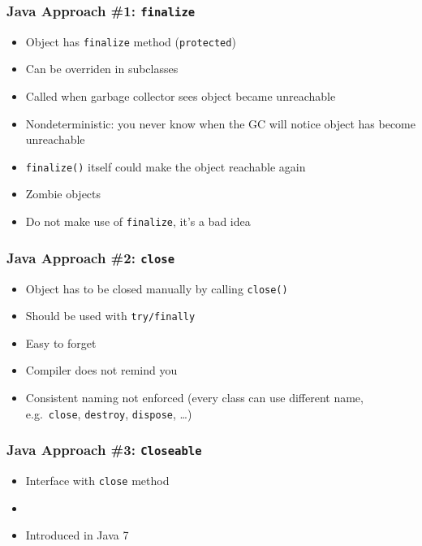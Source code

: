 \begin{frame}
  \frametitle{Java Approach \#1: {\tt finalize}}
  \begin{itemize}
    \item Object has {\tt finalize} method ({\tt protected})
    \item Can be overriden in subclasses
    \item Called when garbage collector sees object became unreachable
  \end{itemize}
  \vskip5mm
  \begin{itemize}
    \item Nondeterministic: you never know when the GC will notice object has become unreachable
    \item {\tt finalize()} itself could make the object reachable again
    \item Zombie objects
    \item Do not make use of {\tt finalize}, it's a bad idea
  \end{itemize}
\end{frame}

\begin{frame}
  \frametitle{Java Approach \#2: {\tt close}}
  \begin{itemize}
    \item Object has to be closed manually by calling {\tt close()}
    \item Should be used with {\tt try/finally}
  \end{itemize}
  \vskip5mm
  \begin{itemize}
    \item Easy to forget
    \item Compiler does not remind you
    \item Consistent naming not enforced (every class can use different name, e.g.\ {\tt close}, {\tt destroy}, {\tt dispose}, \dots)
  \end{itemize}
\end{frame}

\begin{frame}
  \frametitle{Java Approach \#3: {\tt Closeable}}
  \begin{itemize}
    \item Interface with {\tt close} method
    \item {}
    \item Introduced in Java 7
  \end{itemize}
  \vskip5mm
\end{frame}

